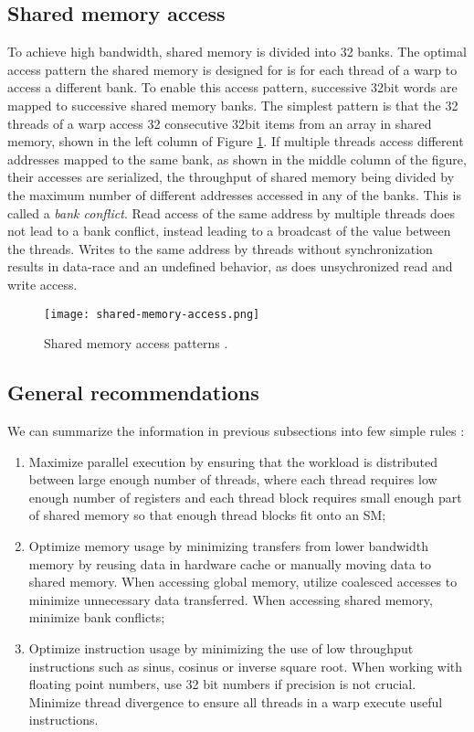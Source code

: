 \subsection{Shared memory access}
To achieve high bandwidth, shared memory is divided into 32 banks. The optimal access pattern the shared memory is designed for is for each thread of a warp to access a different bank. To enable this access pattern, successive 32bit words are mapped to successive shared memory banks. The simplest pattern is that the 32 threads of a warp access 32 consecutive 32bit items from an array in shared memory, shown in the left column of Figure \ref{fig:shared_memory_access}. If multiple threads access different addresses mapped to the same bank, as shown in the middle column of the figure, their accesses are serialized, the throughput of shared memory being divided by the maximum number of different addresses accessed in any of the banks. This is called a \textit{bank conflict}. Read access of the same address by multiple threads does not lead to a bank conflict, instead leading to a broadcast of the value between the threads. Writes to the same address by threads without synchronization results in data-race and an undefined behavior, as does unsychronized read and write access.

\begin{figure}[ht]
	\centering
	\texttt{[image: shared-memory-access.png]}
	\caption{Shared memory access patterns \citep{site:cuda}.}
	\label{fig:shared_memory_access}
\end{figure}

\subsection{General recommendations}

We can summarize the information in previous subsections into few simple rules \citep{site:cuda}:

\begin{enumerate}
	\item Maximize parallel execution by ensuring that the workload is distributed between large enough number of threads, where each thread requires low enough number of registers and each thread block requires small enough part of shared memory so that enough thread blocks fit onto an SM;
	\item Optimize memory usage by minimizing transfers from lower bandwidth memory by reusing data in hardware cache or manually moving data to shared memory. When accessing global memory, utilize coalesced accesses to minimize unnecessary data transferred. When accessing shared memory, minimize bank conflicts;
	\item Optimize instruction usage by minimizing the use of low throughput instructions such as sinus, cosinus or inverse square root. When working with floating point numbers, use 32 bit numbers if precision is not crucial. Minimize thread divergence to ensure all threads in a warp execute useful instructions.
\end{enumerate}

